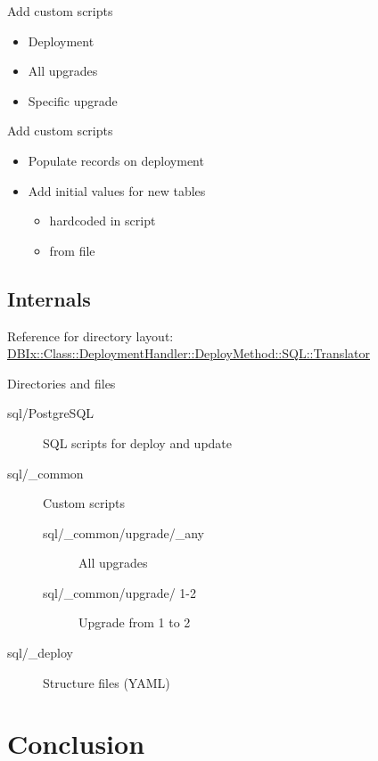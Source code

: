 \begin{frame}{Add custom scripts}
\begin{itemize}
\item Deployment
\item All upgrades
\item Specific upgrade
\end{itemize}
\end{frame}

\begin{frame}{Add custom scripts}
\begin{itemize}
\item Populate records on deployment
\item Add initial values for new tables
\begin{itemize}
\item hardcoded in script
\item from file
\end{itemize}
\end{itemize}
\end{frame}

\subsection{Internals}

Reference for directory layout:
\href{https://metacpan.org/pod/DBIx::Class::DeploymentHandler::DeployMethod::SQL::Translator}{DBIx::Class::DeploymentHandler::DeployMethod::SQL::Translator}

\begin{frame}[fragile]{Directories and files}
\begin{description}
\item[sql/PostgreSQL] SQL scripts for deploy and update
\item[sql/\_common] Custom scripts
\begin{description}
\item[sql/\_common/upgrade/\_any] All upgrades
\item[sql/\_common/upgrade/ 1-2] Upgrade from 1 to 2
\end{description}
\item[sql/\_deploy] Structure files (YAML)
\end{description}
\end{frame}

\section{Conclusion}

